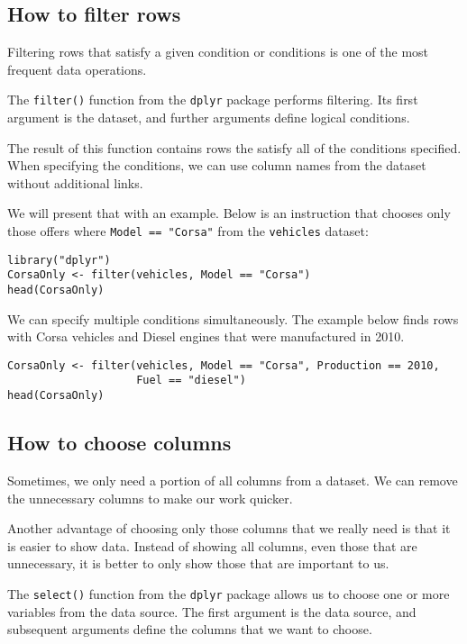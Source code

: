\documentclass[]{book}
\theoremstyle{definition}
\theoremstyle{definition}
\theoremstyle{definition}
\theoremstyle{remark}
\begin{document}
\subsection{How to filter rows}\label{part_251}

Filtering rows that satisfy a given condition or conditions is one of
the most frequent data operations.

The \texttt{filter()} function from the \texttt{dplyr} package performs
filtering. Its first argument is the dataset, and further arguments
define logical conditions.

The result of this function contains rows the satisfy all of the
conditions specified. When specifying the conditions, we can use column
names from the dataset without additional links.

We will present that with an example. Below is an instruction that
chooses only those offers where \texttt{Model\ ==\ "Corsa"} from the
\texttt{vehicles} dataset:

\begin{verbatim}
library("dplyr")
CorsaOnly <- filter(vehicles, Model == "Corsa")
head(CorsaOnly)
\end{verbatim}

We can specify multiple conditions simultaneously. The example below
finds rows with Corsa vehicles and Diesel engines that were manufactured
in 2010.

\begin{verbatim}
CorsaOnly <- filter(vehicles, Model == "Corsa", Production == 2010,
                    Fuel == "diesel")
head(CorsaOnly)
\end{verbatim}

\subsection{How to choose columns}\label{part_252}

Sometimes, we only need a portion of all columns from a dataset. We can
remove the unnecessary columns to make our work quicker.

Another advantage of choosing only those columns that we really need is
that it is easier to show data. Instead of showing all columns, even
those that are unnecessary, it is better to only show those that are
important to us.

The \texttt{select()} function from the \texttt{dplyr} package allows us
to choose one or more variables from the data source. The first argument
is the data source, and subsequent arguments define the columns that we
want to choose.
\end{document}
